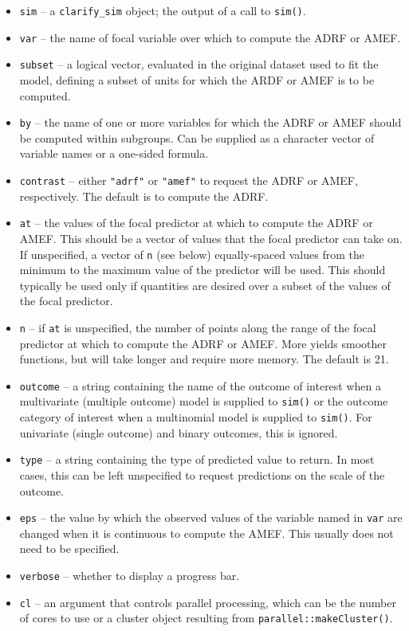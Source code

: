 \begin{itemize}
\item
  \texttt{sim} -- a \texttt{clarify\_sim} object; the output of a call to \texttt{sim()}.
\item
  \texttt{var} -- the name of focal variable over which to compute the ADRF or AMEF.
\item
  \texttt{subset} -- a logical vector, evaluated in the original dataset used to fit the model, defining a subset of units for which the ARDF or AMEF is to be computed.
\item
  \texttt{by} -- the name of one or more variables for which the ADRF or AMEF should be computed within subgroups. Can be supplied as a character vector of variable names or a one-sided formula.
\item
  \texttt{contrast} -- either \texttt{"adrf"} or \texttt{"amef"} to request the ADRF or AMEF, respectively. The default is to compute the ADRF.
\item
  \texttt{at} -- the values of the focal predictor at which to compute the ADRF or AMEF. This should be a vector of values that the focal predictor can take on. If unspecified, a vector of \texttt{n} (see below) equally-spaced values from the minimum to the maximum value of the predictor will be used. This should typically be used only if quantities are desired over a subset of the values of the focal predictor.
\item
  \texttt{n} -- if \texttt{at} is unspecified, the number of points along the range of the focal predictor at which to compute the ADRF or AMEF. More yields smoother functions, but will take longer and require more memory. The default is 21.
\item
  \texttt{outcome} -- a string containing the name of the outcome of interest when a multivariate (multiple outcome) model is supplied to \texttt{sim()} or the outcome category of interest when a multinomial model is supplied to \texttt{sim()}. For univariate (single outcome) and binary outcomes, this is ignored.
\item
  \texttt{type} -- a string containing the type of predicted value to return. In most cases, this can be left unspecified to request predictions on the scale of the outcome.
\item
  \texttt{eps} -- the value by which the observed values of the variable named in \texttt{var} are changed when it is continuous to compute the AMEF. This usually does not need to be specified.
\item
  \texttt{verbose} -- whether to display a progress bar.
\item
  \texttt{cl} -- an argument that controls parallel processing, which can be the number of cores to use or a cluster object resulting from \texttt{parallel::makeCluster()}.
\end{itemize}

